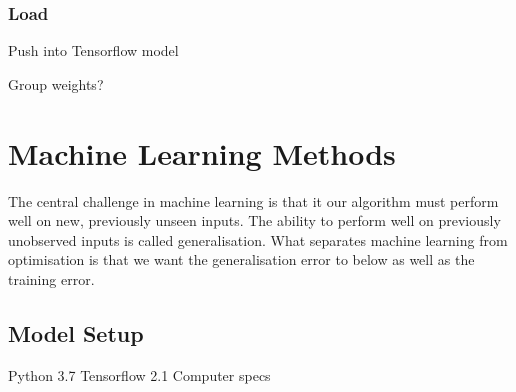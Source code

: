 

\subsubsection{Load}
Push into Tensorflow model

Group weights?


\section{Machine Learning Methods}
The central challenge in machine learning is that it our algorithm must perform well on new, previously unseen inputs. The ability to perform well on previously unobserved inputs is called generalisation.
What separates machine learning from optimisation is that we want the generalisation error to below as well as the training error.\cite{Goodfellow2015}

\subsection{Model Setup}
Python 3.7
Tensorflow 2.1
Computer specs



